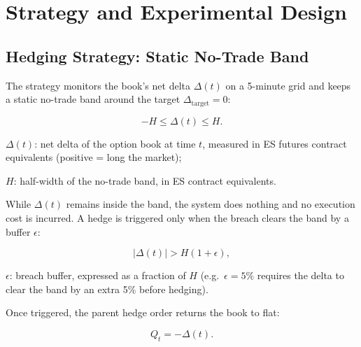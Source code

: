 \documentclass{article}
\begin{document}
\section{Strategy and Experimental Design}

\subsection{Hedging Strategy: Static No-Trade Band}

The strategy monitors the book's net delta $\Delta(t)$ on a 5-minute grid and keeps a
static no-trade band around the target $\Delta_{\text{target}} = 0$:

\begin{eqbox}
\begin{equation}
-H \le \Delta(t) \le H.
\end{equation}
\end{eqbox}

\begin{vardefs}
\item $\Delta(t)$: net delta of the option book at time $t$, measured in ES futures
  contract equivalents (positive = long the market);
\item $H$: half-width of the no-trade band, in ES contract equivalents.
\end{vardefs}

While $\Delta(t)$ remains inside the band, the system does nothing and no execution cost
is incurred. A hedge is triggered only when the breach clears the band by a buffer
$\epsilon$:

\begin{eqbox}
\begin{equation}
\lvert \Delta(t) \rvert > H(1+\epsilon),
\label{eq:trigger}
\end{equation}
\end{eqbox}

\begin{vardefs}
\item $\epsilon$: breach buffer, expressed as a fraction of $H$ (e.g.\ $\epsilon = 5\%$
  requires the delta to clear the band by an extra 5\% before hedging).
\end{vardefs}

Once triggered, the parent hedge order returns the book to flat:

\begin{eqbox}
\begin{equation}
Q_t = -\Delta(t).
\end{equation}
\end{eqbox}
\end{document}
